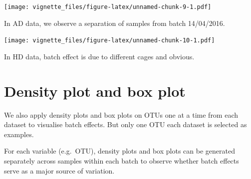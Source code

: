 \documentclass[]{book}
\newenvironment{Shaded}{\begin{snugshade}}{\end{snugshade}}
\newcommand{\KeywordTok}[1]{\textcolor[rgb]{0.13,0.29,0.53}{\textbf{#1}}}
\newcommand{\DataTypeTok}[1]{\textcolor[rgb]{0.13,0.29,0.53}{#1}}
\newcommand{\DecValTok}[1]{\textcolor[rgb]{0.00,0.00,0.81}{#1}}
\newcommand{\StringTok}[1]{\textcolor[rgb]{0.31,0.60,0.02}{#1}}
\newcommand{\CommentTok}[1]{\textcolor[rgb]{0.56,0.35,0.01}{\textit{#1}}}
\newcommand{\OperatorTok}[1]{\textcolor[rgb]{0.81,0.36,0.00}{\textbf{#1}}}
\newcommand{\NormalTok}[1]{#1}
\begin{document}
\texttt{[image: vignette\_files/figure-latex/unnamed-chunk-9-1.pdf]}

In AD data, we observe a separation of samples from batch 14/04/2016.

\begin{Shaded}
\end{Shaded}

\texttt{[image: vignette\_files/figure-latex/unnamed-chunk-10-1.pdf]}

In HD data, batch effect is due to different cages and obvious.

\section{Density plot and box plot}\label{density-plot-and-box-plot}

We also apply density plots and box plots on OTUs one at a time from
each dataset to visualise batch effects. But only one OTU each dataset
is selected as examples.

For each variable (e.g.~OTU), density plots and box plots can be
generated separately across samples within each batch to observe whether
batch effects serve as a major source of variation.

\begin{Shaded}
\end{Shaded}
\end{document}
